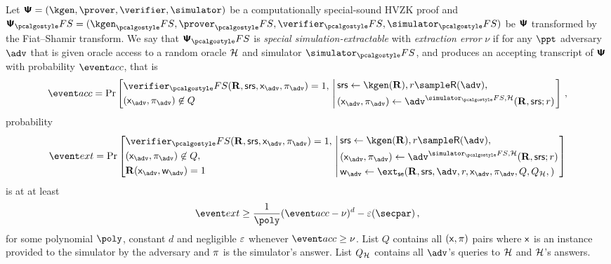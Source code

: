\documentclass[runningheads,11pt]{llncs}
\begin{document}
\begin{definition}
	\label{def:simext}
	Let $\ps = (\kgen, \prover, \verifier, \simulator)$ be a computationally
  special-sound HVZK proof and $\ps_\fs = (\kgen_\fs, \prover_\fs,
  \verifier_\fs, \simulator_\fs)$ be $\bm{\mathsf{\Psi}}$ transformed by the Fiat--Shamir
  transform. We say that $\ps_\fs$ is \emph{special simulation-extractable} with
  \emph{extraction error} $\nu$ if for any $\ppt$ adversary $\adv$ that is given
  oracle access to a random oracle $\mathcal{H}$ and simulator $\simulator_\fs$, and
  produces an accepting transcript of $\bm{\mathsf{\Psi}}$ with probability $\accProb$, that is
	\[
		\accProb = \Pr \left[
		\begin{aligned}
			& \verifier_\fs(\REL, \srs, \inp_{\advse}, \zkproof_{\advse}) = 1,\\
			& (\inp_{\advse}, \zkproof_{\advse}) \not\in Q
		\end{aligned}
		\, \left| \,
		\begin{aligned}
			& \srs \gets \kgen(\REL), r \sample \RND{\advse}, \\
			& (\inp_{\advse}, \zkproof_{\advse}) \gets \advse^{\simulator_\fs,
			\ro} (\REL, \srs; r) 
		\end{aligned}
		\right.\right]\,,
	\]
	probability
	\[
		\extProb = \Pr \left[
		\begin{aligned}
			& \verifier_\fs(\REL, \srs, \inp_{\advse}, \zkproof_{\advse}) = 1,\\
			& (\inp_{\advse}, \zkproof_{\advse}) \not\in Q,\\
			& \REL(\inp_{\advse}, \wit_{\advse}) = 1
		\end{aligned}
		\, \left| \,
		\begin{aligned}
			& \srs \gets \kgen(\REL), r \sample \RND{\advse},\\
			& (\inp_{\advse}, \zkproof_{\advse}) \gets \advse^{\simulator_\fs,
			\ro} (\REL, \srs; r) \\
			& \wit_{\advse} \gets \ext_\se (\REL, \srs, \advse, r, \inp_{\advse}, \zkproof_{\advse},
			Q, Q_\ro,) 
		\end{aligned}
		\right.\right]
	\]
	is at at least 
	\[
		\extProb \geq \frac{1}{\poly} (\accProb - \nu)^d - \eps(\secpar)\,,
	\]
	for some polynomial $\poly$, constant $d$ and negligible $\varepsilon$ whenever
  $\accProb \geq \nu$. List $Q$ contains all $(\mathsf{x}, \pi)$ pairs where
  $\mathsf{x}$ is an instance provided to the simulator by the adversary and
  $\pi$ is the simulator's answer. List $Q_{\mathcal{H}}$ contains all $\advse$'s
  queries to $\mathcal{H}$ and $\mathcal{H}$'s answers.
\end{definition}
\end{document}
